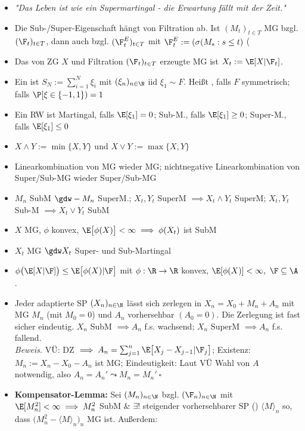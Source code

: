 \begin{itemize}
		\item \textit{"Das Leben ist wie ein Supermartingal - die Erwartung fällt mit der Zeit."}
		\item Die Sub-/Super-Eigenschaft hängt von Filtration ab.
		Ist $(M_t)_{t\in T}$ MG bzgl. $(\F_t)_{t\in T}$, dann auch bzgl. $(\F_t^E)_{t\in T}$ mit $\F_t^E:=(\sigma(M_s:s\leq t)$ (
		\item Das von ZG $X$ und Filtration $(\F_t)_{t\in T}$ erzeugte MG ist $X_t:=\E[X|\F_t]$.
		\item Ein  ist $S_N:=\sum_{i=1}^N\xi_i$ mit $(\xi_n)_{n\in\N}$ iid $\xi_1\sim F$.
		Heißt , falls $F$ symmetrisch;  falls $\P[\xi\in\lbrace-1,1\rbrace)=1$
		\item Ein RW ist Martingal, falls $\E[\xi_1]=0$; Sub-M., falls $\E[\xi_1]\geq0$; Super-M., falls $\E[\xi_1]\leq0$
		\item $X\wedge Y:=\min\lbrace X,Y\rbrace$ und $X\vee Y:=\max\lbrace X,Y\rbrace$
		\item Linearkombination von MG wieder MG; nichtnegative Linearkombination von Super/Sub-MG wieder Super/Sub-MG
		\item $M_n$ SubM $\gdw -M_n$ SuperM.; $X_t,Y_t$ SuperM $\implies X_t\wedge Y_t$ SuperM; $X_t,Y_t$ Sub-M $\implies X_t\vee Y_t$ SubM
		\item $X$ MG, $\phi$ konvex, $\E\big[\phi(X)\big]<\infty\implies \phi(X_t)$ ist SubM
		\item $X_t$ MG $\gdw X_t$ Super- und Sub-Martingal
		\item {} $\phi\big(\E[X|\F]\big)\leq\E\big[\phi(X)|\F\big]$ mit $\phi:\R\to\R$ konvex, $\E[\phi(X)]<\infty,~\F\subseteq\A$.
		\item {} Jeder adaptierte SP $(X_n)_{n\in\N}$ lässt sich zerlegen in $X_n=X_0+M_n+A_n$ mit MG $M_n$ (mit $M_0=0$) und $A_n$ vorhersehbar $(A_0=0)$. Die Zerlegung ist fast sicher eindeutig.
		$X_n$ SubM $\implies A_n$ f.s. wachsend; $X_n$ SuperM $\implies A_n$ f.s. fallend.\\
		\textit{Beweis.} VÜ: DZ $\implies A_n=\sum_{j=1}^n\E\big[X_j-X_{j-1}|\F_j\big]$; Existenz: $M_n:=X_n-X_0-A_n$ ist MG; Eindeutigkeit: Laut VÜ Wahl von $A$ notwendig, also $A_n=A_n'\leadsto M_n=M_n'~\square$
		\item \textbf{Kompensator-Lemma:} Sei $(M_n)_{n\in\N}$ bzgl. $(\F_n)_{n\in\N}$ mit $\E[M_n^2]<\infty\implies M_n^2$ SubM \& $\exists!$ steigender vorhersehbarer SP () $\langle M\rangle_n$ so, dass $\big(M_n^2-\langle M\rangle_n\big)_n$ MG ist. Außerdem:\\

\end{itemize}
